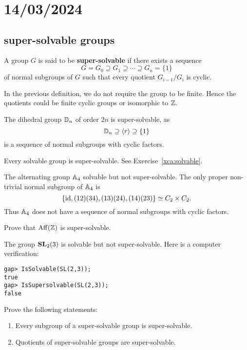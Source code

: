 \section{14/03/2024}

\subsection{super-solvable groups}

\begin{definition}
A group $G$ is said to be \textbf{super-solvable} if there exists a sequence 
\[
G=G_0\supseteq G_1\supseteq\cdots\supseteq G_n=\{1\}
\]
of normal subgroups of $G$ such that every 
quotient $G_{i-1}/G_i$ is cyclic. 
\end{definition}

In the previous definition, we do not require the group to be finite. Hence the quotients 
could be finite cyclic groups or isomorphic to $\mathbb{Z}$. 

\begin{example}
The dihedral group $\mathbb{D}_{n}$ of order $2n$ is super-solvable, as 
\[	
\mathbb{D}_{n}\supseteq \langle
r\rangle\supseteq \{1\}
\]
is a sequence of normal subgroups with cyclic factors. 
\end{example}

Every solvable group is super-solvable. See Exercise~\ref{xca:solvable}.

\begin{example}
The alternating group $\mathbb{A}_4$ solvable but not super-solvable. The only 
proper non-trivial normal subgroup of $\mathbb{A}_4$ is 
	\[
	\{\operatorname{id},(12)(34),(13)(24),(14)(23)\}\simeq C_2\times C_2.
	\]
Thus $\mathbb{A}_4$ does not have a sequence of normal subgroups 
with cyclic factors. 
\end{example}

\begin{exercise}
\label{xca:Aff_supersolvable}
Prove that $\mathrm{Aff}(\mathbb{Z})$ is super-solvable. 
\end{exercise}

\begin{example}
The group $\mathbf{SL}_2(3)$ is solvable but not super-solvable. Here is a computer verification: 
\begin{lstlisting}
gap> IsSolvable(SL(2,3));
true
gap> IsSupersolvable(SL(2,3));
false
\end{lstlisting}
\end{example}

\begin{exercise}
\label{xca:super}
Prove the following statements: 
\begin{enumerate}
\item Every subgroup of a super-solvable group is super-solvable. 
\item Quotients of super-solvable groups are super-solvable. 
\end{enumerate}
\end{exercise}

